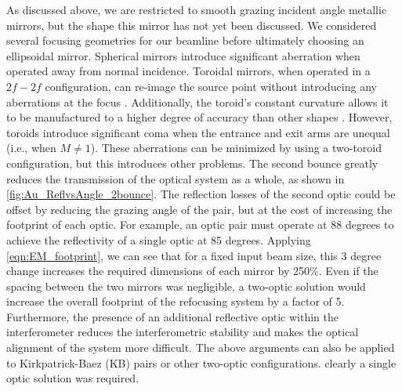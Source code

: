 As discussed above, we are restricted to smooth grazing incident angle metallic mirrors, but the shape this mirror has not yet been discussed. We considered several focusing geometries for our beamline before ultimately choosing an ellipsoidal mirror. Spherical mirrors introduce significant aberration when operated away from normal incidence. Toroidal mirrors, when operated in a $2f-2f$ configuration, can re-image the source point without introducing any aberrations at the focus \cite{chirlaAttosecondPulseGeneration2011}. Additionally, the toroid's constant curvature allows it to be manufactured to a higher degree of accuracy than other shapes \cite{howellsMirrorsSynchrotronRadiationBeamlines1994}. However, toroids introduce significant coma when the entrance and exit arms are unequal (i.e., when $M\ne1$). These aberrations can be minimized by using a two-toroid configuration, but this introduces other problems. The second bounce greatly reduces the transmission of the optical system as a whole, as shown in \cref{fig:Au_ReflvsAngle_2bounce}. The reflection losses of the second optic could be offset by reducing the grazing angle of the pair, but at the cost of increasing the footprint of each optic. For example, an optic pair must operate at 88 degrees to achieve the reflectivity of a single optic at 85 degrees. Applying \cref{eqn:EM_footprint}, we can see that for a fixed input beam size, this 3 degree change increases the required dimensions of each mirror by 250\%. Even if the spacing between the two mirrors was negligible, a two-optic solution would increase the overall footprint of the refocusing system by a factor of 5. Furthermore, the presence of an additional reflective optic within the interferometer reduces the interferometric stability and makes the optical alignment of the system more difficult. The above arguments can also be applied to Kirkpatrick-Baez (KB) pairs \cite{kirkpatrickFormationOpticalImages1948} or other two-optic configurations. clearly a single optic solution was required.

